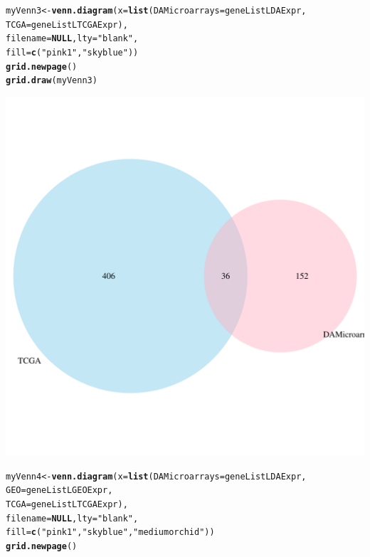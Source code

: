 \documentclass[a4paper,10pt]{article}\usepackage[]{graphicx}\usepackage[]{color}
\makeatletter
\def\maxwidth{ %
  \ifdim\Gin@nat@width>\linewidth
    \linewidth
  \else
    \Gin@nat@width
  \fi
}
\newcommand{\hlstr}[1]{\textcolor[rgb]{0.192,0.494,0.8}{#1}}%
\newcommand{\hlstd}[1]{\textcolor[rgb]{0.345,0.345,0.345}{#1}}%
\newcommand{\hlkwa}[1]{\textcolor[rgb]{0.161,0.373,0.58}{\textbf{#1}}}%
\newcommand{\hlkwb}[1]{\textcolor[rgb]{0.69,0.353,0.396}{#1}}%
\newcommand{\hlkwc}[1]{\textcolor[rgb]{0.333,0.667,0.333}{#1}}%
\newcommand{\hlkwd}[1]{\textcolor[rgb]{0.737,0.353,0.396}{\textbf{#1}}}%
\newenvironment{kframe}{%
 \def\at@end@of@kframe{}%
 \ifinner\ifhmode%
  \def\at@end@of@kframe{\end{minipage}}%
  \begin{minipage}{\columnwidth}%
 \fi\fi%
 \def\FrameCommand##1{\hskip\@totalleftmargin \hskip-\fboxsep
 \colorbox{shadecolor}{##1}\hskip-\fboxsep
     \hskip-\linewidth \hskip-\@totalleftmargin \hskip\columnwidth}%
 \MakeFramed {\advance\hsize-\width
   \@totalleftmargin\z@ \linewidth\hsize
   \@setminipage}}%
 {\par\unskip\endMakeFramed%
 \at@end@of@kframe}
\newenvironment{knitrout}{}{} %
\makeatother
\begin{document}
\begin{knitrout}
\begin{kframe}
\begin{alltt}
\hlstd{myVenn3}\hlkwb{<-} \hlkwd{venn.diagram}\hlstd{(}\hlkwc{x}\hlstd{=}\hlkwd{list}\hlstd{(}\hlkwc{DAMicroarrays}\hlstd{=geneListLDAExpr,}
                              \hlkwc{TCGA}\hlstd{=geneListLTCGAExpr),}
                              \hlkwc{filename}\hlstd{=}\hlkwa{NULL}\hlstd{,} \hlkwc{lty} \hlstd{=} \hlstr{"blank"}\hlstd{,}
                              \hlkwc{fill}\hlstd{=}\hlkwd{c}\hlstd{(}\hlstr{"pink1"}\hlstd{,} \hlstr{"skyblue"}\hlstd{))}
\hlkwd{grid.newpage}\hlstd{()}
\hlkwd{grid.draw}\hlstd{(myVenn3)}
\end{alltt}
\end{kframe}
\includegraphics[width=\maxwidth]{figure/selectLGenes1-2} 
\begin{kframe}\begin{alltt}
\hlstd{myVenn4}\hlkwb{<-} \hlkwd{venn.diagram}\hlstd{(}\hlkwc{x}\hlstd{=}\hlkwd{list}\hlstd{(}\hlkwc{DAMicroarrays}\hlstd{=geneListLDAExpr,}
                              \hlkwc{GEO}\hlstd{=geneListLGEOExpr,}
                              \hlkwc{TCGA}\hlstd{=geneListLTCGAExpr),}
                              \hlkwc{filename}\hlstd{=}\hlkwa{NULL}\hlstd{,} \hlkwc{lty} \hlstd{=} \hlstr{"blank"}\hlstd{,}
                              \hlkwc{fill}\hlstd{=}\hlkwd{c}\hlstd{(}\hlstr{"pink1"}\hlstd{,} \hlstr{"skyblue"}\hlstd{,} \hlstr{"mediumorchid"}\hlstd{))}
\hlkwd{grid.newpage}\hlstd{()}

\end{alltt}
\end{kframe}
\end{knitrout}
\end{document}
